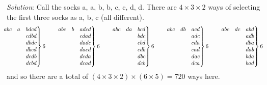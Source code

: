 \documentclass{article}
\begin{document}
\begin{enumerate}[1.]
\textit{Solution}:
Call the socks a, a, b, b, c, c, d, d.
There are $4 \times 3 \times 2$ ways of selecting the first three socks as a, b, c (all different).
$$
\mspace{-12mu}
\left. \begin{matrix}
  abc & a & bdcd \\
  & & cdbd \\
  & & dbdc \\
  & & dbcd \\
  & & dcdb \\
  & & dcbd
\end{matrix} \right\} 6
\qquad
\left. \begin{matrix}
  abc & b & adcd \\
  & & cdad \\
  & & dadc \\
  & & dacd \\
  & & dcda \\
  & & dcad
\end{matrix} \right\} 6
\qquad
\left. \begin{matrix}
  abc & da & bcd \\
  & & bdc \\
  & & cbd \\
  & & cdb \\
  & & dbc \\
  & & dcb
\end{matrix} \right\} 6
\qquad
\left. \begin{matrix}
  abc & db & acd \\
  & & adc \\
  & & cda \\
  & & cad \\
  & & dac \\
  & & dca
\end{matrix} \right\} 6
\qquad
\left. \begin{matrix}
  abc & dc & abd \\
  & & adb \\
  & & dba \\
  & & dab \\
  & & bda \\
  & & bad
\end{matrix} \right\} 6
$$
and so there are a total of $(4 \times 3 \times 2) \times (6 \times 5) = 720$ ways here.


\end{enumerate}
\end{document}

